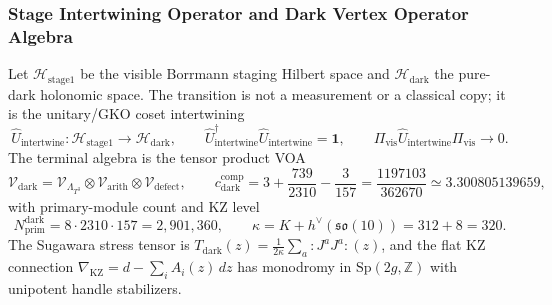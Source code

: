 \documentclass[11pt,onecolumn]{article}
\begin{document}
\subsubsection{Stage Intertwining Operator and Dark Vertex Operator Algebra}
\label{subsec:logos_stage_intertwining}
Let $\mathcal H_{\text{stage1}}$ be the visible Borrmann staging Hilbert space and $\mathcal H_{\text{dark}}$ the pure-dark holonomic space. The transition is not a measurement or a classical copy; it is the unitary/GKO coset intertwining
\begin{equation}
\widehat U_{\text{intertwine}}:\mathcal H_{\text{stage1}}\longrightarrow\mathcal H_{\text{dark}},
\qquad
\widehat U_{\text{intertwine}}^\dagger\widehat U_{\text{intertwine}}=\mathbf 1,
\qquad
\Pi_{\text{vis}}\widehat U_{\text{intertwine}}\Pi_{\text{vis}}\longrightarrow0 .
\label{eq:intertwining_unitary}
\end{equation}
The terminal algebra is the tensor product VOA
\begin{equation}
\mathcal V_{\text{dark}}=\mathcal V_{\Lambda_{T^3}}\otimes\mathcal V_{\text{arith}}\otimes\mathcal V_{\text{defect}},
\qquad
c_{\text{dark}}^{\text{comp}}=3+\frac{739}{2310}-\frac{3}{157}=\frac{1197103}{362670}\simeq3.300805139659,
\label{eq:dark_voa_explicit}
\end{equation}
with primary-module count and KZ level
\begin{equation}
N_{\text{prim}}^{\text{dark}}=8\cdot2310\cdot157=2{,}901{,}360,
\qquad
\kappa=K+h^\vee(\mathfrak{so}(10))=312+8=320 .
\label{eq:dark_modules_kz}
\end{equation}
The Sugawara stress tensor is $T_{\text{dark}}(z)=\frac1{2\kappa}\sum_a:J^aJ^a:(z)$, and the flat KZ connection $\nabla_{\text{KZ}}=d-\sum_i A_i(z)\,dz$ has monodromy in $\mathrm{Sp}(2g,\mathbb Z)$ with unipotent handle stabilizers.
\end{document}
